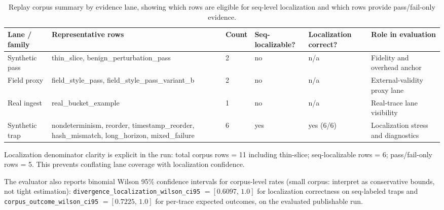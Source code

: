 \documentclass[11pt]{article}
\newcommand{\field}[1]{\texttt{#1}}
\begin{document}
\begin{table}[H]
\centering
\caption{Replay corpus summary by evidence lane, showing which rows are eligible for seq-level localization and which rows provide pass/fail-only evidence.}
\label{tab:corpus}
\begin{tabular}{p{2.8cm}p{3.2cm}p{1.1cm}p{1.4cm}p{1.5cm}p{2.6cm}}
\toprule
Lane / family & Representative rows & Count & Seq-localizable? & Localization correct? & Role in evaluation \\
\midrule
Synthetic pass & thin\_slice, benign\_perturbation\_pass & 2 & no & n/a & Fidelity and overhead anchor \\
Field proxy & field\_style\_pass, field\_style\_pass\_variant\_b & 2 & no & n/a & External-validity proxy lane \\
Real ingest & real\_bucket\_example & 1 & no & n/a & Real-trace lane visibility \\
Synthetic trap & nondeterminism, reorder, timestamp\_reorder, hash\_mismatch, long\_horizon, mixed\_failure & 6 & yes & yes (6/6) & Localization stress and diagnostics \\
\bottomrule
\end{tabular}
\end{table}

Localization denominator clarity is explicit in the run: total corpus rows = 11 including thin-slice; seq-localizable rows = 6; pass/fail-only rows = 5. This prevents conflating lane coverage with localization confidence.

The evaluator also reports binomial Wilson 95\% confidence intervals for corpus-level rates (small corpus: interpret as conservative bounds, not tight estimation): \field{divergence\_localization\_wilson\_ci95} $= [0.6097,\,1.0]$ for localization correctness on seq-labeled traps and \field{corpus\_outcome\_wilson\_ci95} $= [0.7225,\,1.0]$ for per-trace expected outcomes, on the evaluated publishable run.
\end{document}

